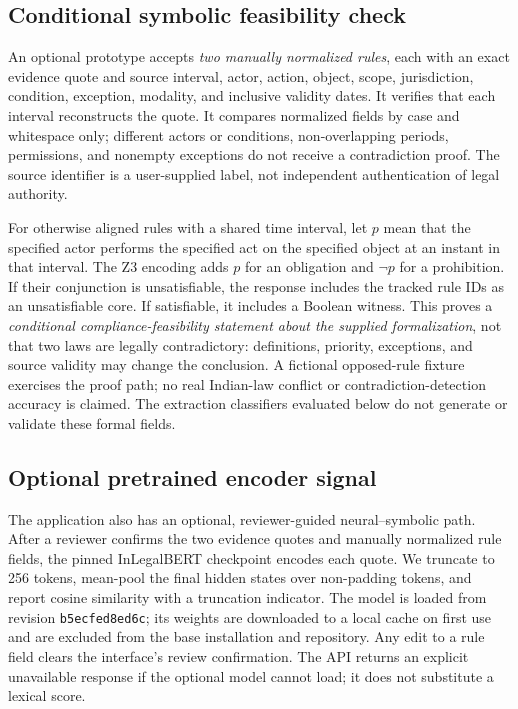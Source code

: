 \documentclass[11pt,a4paper]{article}
\newcommand{\field}[1]{\texttt{#1}}
\begin{document}
\subsection{Conditional symbolic feasibility check}
An optional prototype accepts \emph{two manually normalized rules}, each with an exact evidence quote and source interval, actor, action, object, scope, jurisdiction, condition, exception, modality, and inclusive validity dates. It verifies that each interval reconstructs the quote. It compares normalized fields by case and whitespace only; different actors or conditions, non-overlapping periods, permissions, and nonempty exceptions do not receive a contradiction proof. The source identifier is a user-supplied label, not independent authentication of legal authority.

For otherwise aligned rules with a shared time interval, let $p$ mean that the specified actor performs the specified act on the specified object at an instant in that interval. The Z3 encoding adds $p$ for an obligation and $\neg p$ for a prohibition. If their conjunction is unsatisfiable, the response includes the tracked rule IDs as an unsatisfiable core. If satisfiable, it includes a Boolean witness. This proves a \emph{conditional compliance-feasibility statement about the supplied formalization}, not that two laws are legally contradictory: definitions, priority, exceptions, and source validity may change the conclusion. A fictional opposed-rule fixture exercises the proof path; no real Indian-law conflict or contradiction-detection accuracy is claimed. The extraction classifiers evaluated below do not generate or validate these formal fields.

\subsection{Optional pretrained encoder signal}
The application also has an optional, reviewer-guided neural--symbolic path. After a reviewer confirms the two evidence quotes and manually normalized rule fields, the pinned InLegalBERT checkpoint \cite{inlegalbert} encodes each quote. We truncate to 256 tokens, mean-pool the final hidden states over non-padding tokens, and report cosine similarity with a truncation indicator. The model is loaded from revision \field{b5ecfed8ed6c}; its weights are downloaded to a local cache on first use and are excluded from the base installation and repository. Any edit to a rule field clears the interface's review confirmation. The API returns an explicit unavailable response if the optional model cannot load; it does not substitute a lexical score.
\end{document}
